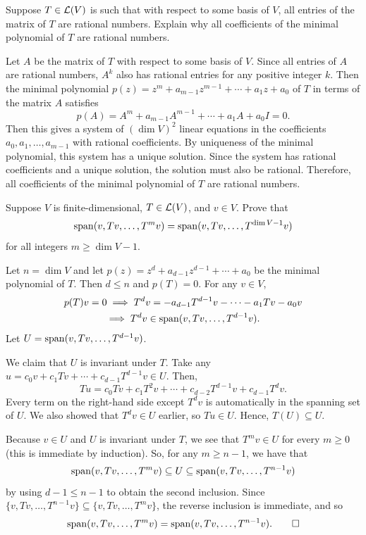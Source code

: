 \begin{exc}
\begin{exercise}
Suppose $T\in\mathcal{L}(V)$ is such that with respect to some basis of $V$, all
entries of the matrix of $T$ are rational numbers. Explain why all
coefficients of the minimal polynomial of $T$ are rational numbers.
\end{exercise}
\begin{solution}
Let $A$ be the matrix of $T$ with respect to some basis of $V$. Since all
entries of $A$ are rational numbers, $A^k$ also has rational entries for any
positive integer $k$. Then the minimal polynomial
$p(z)=z^m+a_{m-1}z^{m-1}+\cdots+a_1z+a_0$ of $T$ in terms of the matrix $A$
satisfies
\[ p(A)=A^m+a_{m-1}A^{m-1}+\cdots+a_1A+a_0I=0. \]
Then this gives a system of $(\dim V)^2$ linear equations in the coefficients
$a_0,a_1,\allowbreak\dots,a_{m-1}$ with rational coefficients. By uniqueness of the
minimal polynomial, this system has a unique solution. Since the system has
rational coefficients and a unique solution, the solution must also be
rational. Therefore, all coefficients of the minimal polynomial of $T$ are
rational numbers.
\end{solution}

\begin{exercise}
Suppose $V$ is finite-dimensional, $T\in\mathcal{L}(V)$, and $v\in V$. Prove that
\[ \operatorname{span}(v,Tv,\dots,T^mv)=\operatorname{span}(v,Tv,\dots,T^{\operatorname{dim} V-1}v) \]
for all integers $m\ge\dim V-1$.
\end{exercise}
\begin{solution}
Let $n=\dim V$ and let $p(z)=z^d+a_{d-1}z^{d-1}+\cdots+a_0$ be the minimal
polynomial of $T$. Then $d\le n$ and $p(T)=0$. For any $v\in V$,
\begin{multline*}
p(T)v=0 \implies T^dv=-a_{d-1}T^{d-1}v-\cdots-a_1Tv-a_0v\\
  \implies T^dv\in\operatorname{span}(v,Tv,\dots,T^{d-1}v).
\end{multline*}
Let $U=\operatorname{span}(v,Tv,\dots,T^{d-1}v)$.

We claim that $U$ is invariant under $T$. Take any
$u=c_0v+c_1Tv+\cdots+c_{d-1}T^{d-1}v\in U$. Then,
\[ Tu=c_0Tv+c_1T^2v+\cdots+c_{d-2}T^{d-1}v+c_{d-1}T^dv. \]
Every term on the right-hand side except $T^dv$ is automatically in the
spanning set of $U$. We also showed that $T^dv\in U$ earlier, so $Tu\in U$.
Hence, $T(U)\subseteq U$.

Because $v\in U$ and $U$ is invariant under $T$, we see that $T^mv\in U$ for
every $m\ge0$ (this is immediate by induction). So, for any $m\ge n-1$, we
have that
\[ \operatorname{span}(v,Tv,\dots,T^mv)\subseteq U\subseteq\operatorname{span}(v,Tv,\dots,T^{n-1}v) \]
by using $d-1\le n-1$ to obtain the second inclusion. Since
$\{v,Tv,\dots,T^{n-1}v\}\subseteq\{v,Tv,\dots,T^mv\}$, the reverse inclusion
is immediate, and so
\[ \operatorname{span}(v,Tv,\dots,T^mv)=\operatorname{span}(v,Tv,\dots,T^{n-1}v). \qedhere \]
\end{solution}


\end{exc}
